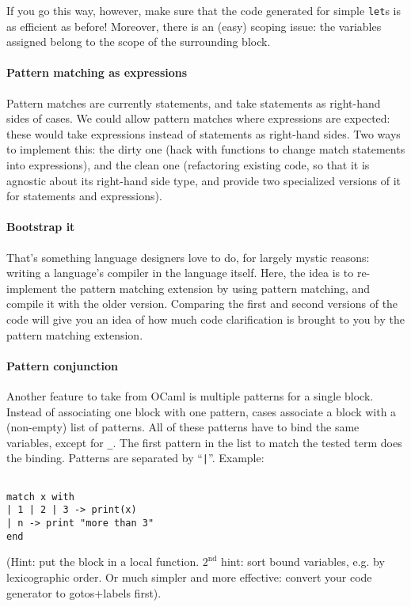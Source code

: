 If you go this way, however, make sure that the code generated for
simple {\tt let}s is as efficient as before! Moreover, there is an (easy) 
scoping issue: the variables assigned belong to the scope of the
surrounding block.

\paragraph{Pattern matching as expressions}
Pattern matches are currently statements, and take statements as
right-hand sides of cases. We could allow pattern matches where
expressions are expected: these would take expressions instead of
statements as right-hand sides. Two ways to implement this: the dirty
one (hack with functions to change match statements into expressions),
and the clean one (refactoring existing code, so that it is agnostic
about its right-hand side type, and provide two specialized
versions of it for statements and expressions).

\paragraph{Bootstrap it}
That's something language designers love to do, for largely mystic
reasons: writing a language's compiler in the language itself. Here,
the idea is to re-implement the pattern matching extension by using
pattern matching, and compile it with the older version. Comparing the
first and second versions of the code will give you an idea of how
much code clarification is brought to you by the pattern matching
extension.

\paragraph{Pattern conjunction} Another feature to take from OCaml is
multiple patterns for a single block. Instead of associating one
block with one pattern, cases associate a block with a (non-empty)
list of patterns. All of these patterns have to bind the same
variables, except for {\tt\_}. The first pattern in the list to match
the tested term does the binding. Patterns are separated by
``\verb+|+''. Example:
\begin{Verbatim}[fontsize=\scriptsize]

match x with
| 1 | 2 | 3 -> print(x)
| n -> print "more than 3"
end
\end{Verbatim}
(Hint: put the block in a local function. $2^{\mathrm{nd}}$ hint: sort
bound variables, e.g. by lexicographic order. Or much simpler and
more effective: convert your code generator to gotos+labels first).

